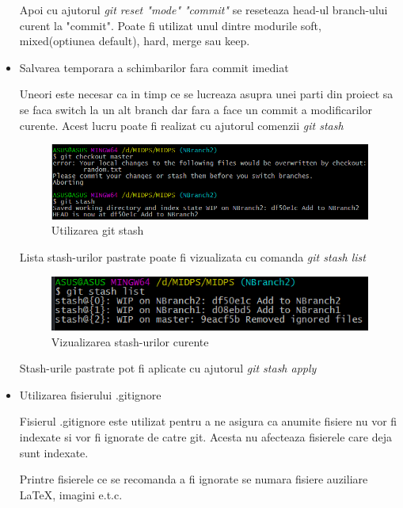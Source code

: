 \begin{itemize}
Apoi cu ajutorul \textit{git reset "mode" "commit"} se reseteaza head-ul branch-ului curent la "commit". Poate fi utilizat unul dintre modurile soft, mixed(optiunea default), hard, merge sau keep.

\item Salvarea temporara a schimbarilor fara commit imediat

Uneori este necesar ca in timp ce se lucreaza asupra unei parti din proiect sa se faca switch la un alt branch dar fara a face un commit a modificarilor curente. Acest lucru poate fi realizat cu ajutorul comenzii \textit{git stash}

\begin{figure}[h!]
			\centering
 			 \includegraphics[scale=0.75]{"task 8 stash"}
 			 \caption{Utilizarea git stash}
 			 \label{fig:stash}
		\end{figure}

Lista stash-urilor pastrate poate fi vizualizata cu comanda \textit{git stash list}

\begin{figure}[h!]
			\centering
 			 \includegraphics[scale=0.75]{"task 8 stashlist"}
 			 \caption{Vizualizarea stash-urilor curente}
 			 \label{fig:stashlist}
		\end{figure}
		
Stash-urile pastrate pot fi aplicate cu ajutorul \textit{git stash apply}
\newpage
	\item Utilizarea fisierului .gitignore
	
Fisierul .gitignore este utilizat pentru a ne asigura ca anumite fisiere nu vor fi indexate si vor fi ignorate de catre git. Acesta nu afecteaza fisierele care deja sunt indexate.

Printre fisierele ce se recomanda a fi ignorate se numara fisiere auziliare LaTeX, imagini e.t.c.


\end{itemize}
